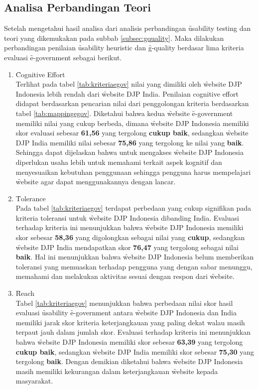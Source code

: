 \subsection{Analisa Perbandingan Teori}
Setelah mengetahui hasil analisa dari analisis perbandingan \f{usability testing} dan teori yang dikemukakan pada subbab \ref{subsec:gquality}. Maka dilakukan perbandingan penilaian \f{usability heuristic} dan \f{g-quality} berdasar lima kriteria evaluasi \f{e-government} sebagai berikut.
\begin{enumerate}
	\item \f{Cognitive Effort}\\
	Terlihat pada tabel \ref{tab:kriteriaegov} nilai yang dimiliki oleh \f{website} DJP Indonesia lebih rendah dari \f{website} DJP India. Penilaian cognitive effort didapat berdasarkan pencarian nilai dari penggolongan kriteria berdasarkan tabel \ref{tab:mappingegov}. Diketahui bahwa kedua \f{website} \f{e-government} memiliki nilai yang cukup berbeda, dimana \f{website} DJP Indonesia memiliki skor evaluasi sebesar \textbf{61,56} yang tergolong \textbf{cukup baik}, sedangkan \f{website} DJP India memiliki nilai sebesar \textbf{75,86} yang tergolong ke nilai yang \textbf{baik}. Sehingga dapat dijelaskan bahwa untuk mengakses \f{website} DJP Indonesia diperlukan usaha lebih untuk memahami terkait aspek kognitif dan menyesuaikan kebutuhan penggunaan sehingga pengguna harus mempelajari \f{website} agar dapat menggunakannya dengan lancar.
	\item \f{Tolerance}\\
	Pada tabel \ref{tab:kriteriaegov} terdapat perbedaan yang cukup signifikan pada kriteria toleransi untuk \f{website} DJP Indonesia dibanding India. Evaluasi terhadap kriteria ini menunjukkan bahwa \f{website} DJP Indonesia memiliki skor sebesar \textbf{58,36} yang digolongkan sebagai nilai yang \textbf{cukup}, sedangkan \f{website} DJP India mendapatkan skor \textbf{76,47} yang tergolong sebagai nilai \textbf{baik}. Hal ini menunjukkan bahwa \f{website} DJP Indonesia belum memberikan toleransi yang memuaskan terhadap pengguna yang dengan sabar menunggu, memahami dan melakukan aktivitas sesuai dengan respon dari \f{website}. 
	\item \f{Reach}\\
	Tabel \ref{tab:kriteriaegov} menunjukkan bahwa perbedaan nilai skor hasil evaluasi \f{usability} \f{e-government} antara \f{website} DJP Indonesia dan India memiliki jarak skor kriteria keterjangkauan yang paling dekat walau masih terpaut jauh dalam jumlah skor. Evaluasi terhadap kriteria ini menunjukkan bahwa \f{website} DJP Indonesia memiliki skor sebesar \textbf{63,39} yang tergolong \textbf{cukup baik}, sedangkan \f{website} DJP India memiliki skor sebesar \textbf{75,30} yang tergolong \textbf{baik}. Dengan demikian diketahui bahwa \f{website} DJP Indonesia masih memiliki kekurangan dalam keterjangkauan \f{website} kepada masyarakat.

\end{enumerate}
